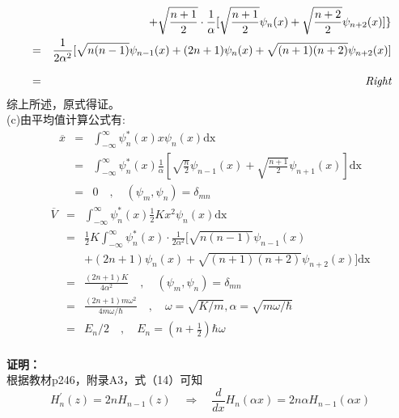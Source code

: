 \documentclass[a4paper]{article}
\begin{document}
\begin{CJK*}{UTF8}{song}
{\begin{eqnarray}
                &   & + \sqrt{\frac{n + 1}{2}}\cdot\frac{1}{\alpha}
                    [\sqrt{\frac{n+1}{2}}\psi_{n}(x) + \sqrt{\frac{n + 2}{2}}\psi_{n+2}(x)]\}\nonumber\\
                & = & \frac{1}{2\alpha^{2}}[\sqrt{n(n-1)}\psi_{n-1}(x)+(2 n + 1)\psi_{n}(x)
                    + \sqrt{(n+1)(n+2)}\psi_{n+2}(x)]\nonumber\\[8pt]
                & = & \emph{Right}\nonumber
    \end{eqnarray}
    综上所述，原式得证。\\[8pt]
    (c)由平均值计算公式有:
    \begin{eqnarray}
        \overline{x}    & = & \int^{\infty}_{-\infty}\psi_{n}^{*}(x) x \psi_{n}(x)\mathrm{d x}\nonumber\\
                    & = & \int^{\infty}_{-\infty}\psi_{n}^{*}(x) \frac{1}{\alpha}[\sqrt{\frac{n}{2}}\psi_{n-1}(x)
                        + \sqrt{\frac{n + 1}{2}}\psi_{n+1}(x)]\mathrm{d x}\nonumber\\
                    & = & 0 \quad , \quad(\psi_{m},\psi_{n})=\delta_{mn}\nonumber
    \end{eqnarray}
    \begin{eqnarray}
        \overline{V}    & = & \int^{\infty}_{-\infty}\psi_{n}^{*}(x) \frac{1}{2} K x^{2}
                            \psi_{n}(x)\mathrm{d x}\nonumber\\
                    & = & \frac{1}{2} K \int^{\infty}_{-\infty}\psi_{n}^{*}(x)\cdot
                        \frac{1}{2\alpha^{2}}[\sqrt{n(n-1)}\psi_{n-1}(x) \nonumber\\
                    &   & +(2 n + 1)\psi_{n}(x)
                        + \sqrt{(n+1)(n+2)}\psi_{n+2}(x)]\mathrm{d x}\nonumber\\
                    & = & \frac{(2n+1)K}{4\alpha^{2}} \quad , \quad(\psi_{m},\psi_{n})=\delta_{mn}\nonumber\\
                    & = & \frac{(2n+1)m\omega^{2}}{4m\omega / \hbar} \quad,
                        \quad \omega = \sqrt{K/m},\alpha=\sqrt{m\omega / \hbar}\nonumber\\
                    & = & E_{n} / 2 \quad , \quad E_{n} = (n + \frac{1}{2})\hbar\omega \nonumber
    \end{eqnarray}
    }\\[20pt]
     \textbf{证明：}\\[12pt]
    {
    根据教材p246，附录A3，式（14）可知
    $$H^{'}_{n}(z) = 2 n H_{n-1}(z) \quad\Rightarrow
        \quad \frac{d}{dx}H_{n}(\alpha x) = 2 n\alpha H_{n-1}(\alpha x)$$
}
\end{CJK*}
\end{document}

